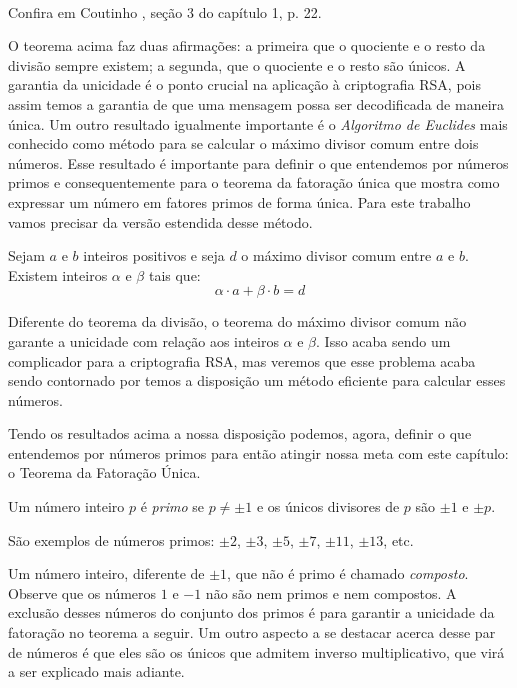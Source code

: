 \\
Confira em Coutinho \cite{coutinho}, se\c{c}\~ao 3 do cap\'itulo 1, p. 22.
\hfill\newline

O teorema acima faz duas afirma\c{c}\~oes: a primeira que o quociente e o resto da divis\~ao sempre existem; a segunda, que o quociente e o resto s\~ao \'unicos. A garantia da unicidade \'e o ponto crucial na aplica\c{c}\~ao \`a criptografia RSA, pois assim temos a garantia de que uma mensagem possa ser decodificada de maneira \'unica. Um outro resultado 
igualmente importante \'e o \textit{Algoritmo de Euclides} mais conhecido como m\'etodo para se calcular o m\'aximo divisor comum entre dois n\'umeros. Esse resultado \'e importante para definir o que entendemos por n\'umeros primos e consequentemente para o teorema da fatora\c{c}\~ao \'unica que mostra como expressar um n\'umero em fatores primos de forma \'unica. Para este trabalho vamos precisar da vers\~ao estendida desse m\'etodo.

\begin{Th}
Sejam $a$ e $b$ inteiros positivos e seja $d$ o m\'aximo divisor comum entre $a$ e $b$. Existem
inteiros $\alpha$ e $\beta$ tais que:
	$$\alpha\cdot a+\beta\cdot b=d$$
\end{Th}

Diferente do teorema da divis\~ao, o teorema do m\'aximo divisor comum n\~ao garante a unicidade com rela\c{c}\~ao aos inteiros $\alpha$ e $\beta$. Isso acaba sendo um complicador para a criptografia RSA, mas veremos que esse problema acaba sendo contornado por temos a disposi\c{c}\~ao um m\'etodo eficiente para calcular esses n\'umeros.

Tendo os resultados acima a nossa disposi\c{c}\~ao podemos, agora, definir o que entendemos por n\'umeros primos para ent\~ao atingir nossa meta com este cap\'itulo: o Teorema da Fatora\c{c}\~ao \'Unica.

\begin{Df}
Um n\'umero inteiro $p$ \'e \textit{primo} se $p\neq \pm 1$ e os \'unicos divisores de $p$ s\~ao $\pm 1$ e $\pm p$. 
\end{Df} 

S\~ao exemplos de n\'umeros primos: $\pm 2$, $\pm 3$, $\pm 5$, $\pm 7$, $\pm 11$, $\pm 13$, etc.

Um n\'umero inteiro, diferente de $\pm 1$, que n\~ao \'e primo \'e chamado \textit{composto}. Observe que os n\'umeros $1$ e $-1$ n\~ao s\~ao nem primos e nem compostos. A exclus\~ao desses n\'umeros do conjunto dos primos \'e para garantir a unicidade da fatora\c{c}\~ao no teorema a seguir. Um outro aspecto a se destacar acerca desse par de n\'umeros \'e que eles s\~ao os \'unicos que admitem inverso multiplicativo, que vir\'a a ser explicado mais adiante.

